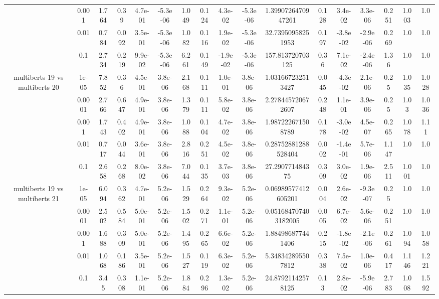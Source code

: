 \begin{tabular}{|c|c|c|c|c|c|c|c|c|c|c|c|c|c|c|c|c|}
 & 0.001 & 1.764 & 0.39 & 4.7e-01 & -5.3e-06 & 1.049 & 0.124 & 4.3e-02 & -5.3e-06 & 1.3990726470947261 & 0.128 & 3.4e-02 & 3.3e-06 & 0.251 & 1.003 & 1.0 \\
 & 0.01 & 0.784 & 0.092 & 3.5e-01 & -5.3e-06 & 1.082 & 0.116 & 1.9e-02 & -5.3e-06 & 32.73950958251953 & 0.197 & -3.8e-02 & -2.9e-06 & 0.269 & 1.0 & 1.0 \\
 & 0.1 & 2.734 & 0.219 & 9.9e-02 & -5.3e-06 & 6.261 & 0.149 & -1.9e-02 & -5.3e-06 & 157.813720703125 & 0.36 & 7.1e-02 & -2.4e-06 & 1.36 & 1.0 & 1.0 \\
\hline
\multirow{5}{*}{multiberts 19 vs multiberts 20} & 1e-05 & 7.852 & 0.36 & 4.5e-01 & 3.8e-06 & 2.168 & 0.111 & 1.0e-01 & 3.8e-06 & 1.031667232513427 & 0.045 & -4.3e-02 & 2.1e-06 & 0.25 & 1.035 & 1.028 \\
 & 0.0001 & 2.766 & 0.647 & 4.9e-01 & 3.8e-06 & 1.379 & 0.111 & 5.8e-02 & 3.8e-06 & 2.278445720672607 & 0.248 & 1.1e-01 & 3.9e-06 & 0.25 & 1.03 & 1.036 \\
 & 0.001 & 1.743 & 0.402 & 4.9e-01 & 3.8e-06 & 1.088 & 0.104 & 4.7e-02 & 3.8e-06 & 1.987222671508789 & 0.178 & -3.0e-02 & 4.5e-07 & 0.265 & 1.078 & 1.11 \\
 & 0.01 & 0.717 & 0.044 & 3.6e-01 & 3.8e-06 & 2.816 & 0.251 & 4.5e-02 & 3.8e-06 & 0.28752881288528404 & 0.002 & -1.4e-01 & 5.7e-06 & 1.147 & 1.0 & 1.0 \\
 & 0.1 & 2.658 & 0.268 & 8.0e-02 & 3.8e-06 & 7.044 & 0.135 & 3.7e-03 & 3.8e-06 & 27.290771484375 & 0.309 & 3.0e-02 & 1.9e-06 & 2.511 & 1.001 & 1.0 \\
\hline
\multirow{5}{*}{multiberts 19 vs multiberts 21} & 1e-05 & 6.094 & 0.362 & 4.7e-01 & 5.2e-06 & 1.529 & 0.264 & 9.3e-02 & 5.2e-06 & 0.06989577412605201 & 0.004 & 2.6e-02 & -9.3e-07 & 0.25 & 1.0 & 1.0 \\
 & 0.0001 & 2.502 & 0.584 & 5.0e-01 & 5.2e-06 & 1.502 & 0.271 & 1.1e-01 & 5.2e-06 & 0.051684707403182005 & 0.005 & 6.7e-02 & 5.6e-06 & 0.251 & 1.0 & 1.0 \\
 & 0.001 & 1.688 & 0.309 & 5.0e-01 & 5.2e-06 & 1.495 & 0.265 & 6.6e-02 & 5.2e-06 & 1.884986877441406 & 0.215 & -1.8e-02 & -2.1e-06 & 0.261 & 1.094 & 1.058 \\
 & 0.01 & 1.068 & 0.186 & 3.5e-01 & 5.2e-06 & 1.527 & 0.119 & 6.3e-02 & 5.2e-06 & 5.348342895507812 & 0.338 & 7.5e-02 & 1.0e-06 & 0.417 & 1.146 & 1.221 \\
 & 0.1 & 3.45 & 0.308 & 1.1e-01 & 5.2e-06 & 1.884 & 0.296 & 1.3e-02 & 5.2e-06 & 24.87921142578125 & 0.13 & 2.8e-02 & -5.9e-06 & 2.783 & 1.008 & 1.592 \\

\end{tabular}
